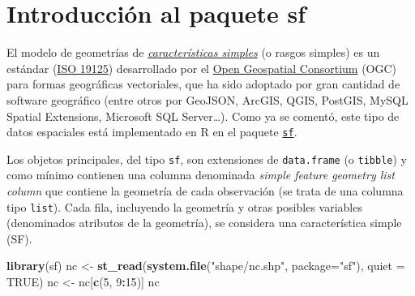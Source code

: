 \documentclass[
]{book}
\newenvironment{Shaded}{\begin{snugshade}}{\end{snugshade}}
\newcommand{\AttributeTok}[1]{\textcolor[rgb]{0.13,0.29,0.53}{#1}}
\newcommand{\ConstantTok}[1]{\textcolor[rgb]{0.56,0.35,0.01}{#1}}
\newcommand{\DecValTok}[1]{\textcolor[rgb]{0.00,0.00,0.81}{#1}}
\newcommand{\FunctionTok}[1]{\textcolor[rgb]{0.13,0.29,0.53}{\textbf{#1}}}
\newcommand{\NormalTok}[1]{#1}
\newcommand{\OtherTok}[1]{\textcolor[rgb]{0.56,0.35,0.01}{#1}}
\newcommand{\SpecialCharTok}[1]{\textcolor[rgb]{0.81,0.36,0.00}{\textbf{#1}}}
\newcommand{\StringTok}[1]{\textcolor[rgb]{0.31,0.60,0.02}{#1}}
\theoremstyle{break}
\theoremstyle{definition}
\theoremstyle{definition}
\theoremstyle{definition}
\theoremstyle{definition}
\theoremstyle{remark}
\begin{document}
\section{\texorpdfstring{Introducción al paquete \textbf{sf}}{Introducción al paquete sf}}\label{sf-intro}

El modelo de geometrías de \emph{\href{https://en.wikipedia.org/wiki/Simple_Features}{características simples}} (o rasgos simples) es un estándar (\href{https://www.iso.org/standard/40114.html}{ISO 19125}) desarrollado por el \href{https://www.ogc.org}{Open Geospatial Consortium} (OGC) para formas geográficas vectoriales, que ha sido adoptado por gran cantidad de software geográfico (entre otros por GeoJSON, ArcGIS, QGIS, PostGIS, MySQL Spatial Extensions, Microsoft SQL Server\ldots).
Como ya se comentó, este tipo de datos espaciales está implementado en R en el paquete \href{https://r-spatial.github.io/sf}{\texttt{sf}}.

Los objetos principales, del tipo \texttt{sf}, son extensiones de \texttt{data.frame} (o \texttt{tibble}) y como mínimo contienen una columna denominada \emph{simple feature geometry list column} que contiene la geometría de cada observación (se trata de una columna tipo \texttt{list}).
Cada fila, incluyendo la geometría y otras posibles variables (denominados atributos de la geometría), se considera una característica simple (SF).

\begin{Shaded}
\begin{Highlighting}[]
\FunctionTok{library}\NormalTok{(sf)}
\NormalTok{nc }\OtherTok{\textless{}{-}} \FunctionTok{st\_read}\NormalTok{(}\FunctionTok{system.file}\NormalTok{(}\StringTok{"shape/nc.shp"}\NormalTok{, }\AttributeTok{package=}\StringTok{"sf"}\NormalTok{), }\AttributeTok{quiet =} \ConstantTok{TRUE}\NormalTok{)}
\NormalTok{nc }\OtherTok{\textless{}{-}}\NormalTok{ nc[}\FunctionTok{c}\NormalTok{(}\DecValTok{5}\NormalTok{, }\DecValTok{9}\SpecialCharTok{:}\DecValTok{15}\NormalTok{)]}
\NormalTok{nc}
\end{Highlighting}
\end{Shaded}
\end{document}
